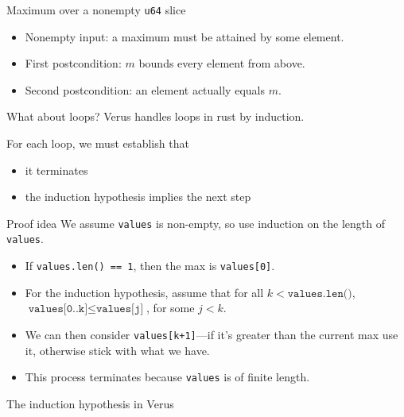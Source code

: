 \begin{frame}[fragile]{Maximum over a nonempty \texttt{u64} slice}

\begin{itemize}
\item Nonempty input: a maximum must be attained by some element.
\item First postcondition: $m$ bounds every element from above.
\item Second postcondition: an element actually equals $m$.
\end{itemize}
\end{frame}

\begin{frame}{What about loops?}
    Verus handles loops in rust by induction.
    
    For each loop, we must establish that
    \begin{itemize}
        \item it terminates
        \item the induction hypothesis implies the next step
    \end{itemize}
    \begin{block}{Proof idea}
        \small
        We assume \texttt{values} is non-empty, so use induction on the length of \texttt{values}.
        \begin{itemize}
            \setlength{\itemsep}{3pt}
            \item If \texttt{values.len() == 1}, then the max is \texttt{values[0]}.
            \item For the induction hypothesis, assume that for all
                $k < \texttt{values.len()}$, $\texttt{values[0..k]} \le \texttt{values[j]}$, for some $j<k$.
            \item We can then consider \texttt{values[k+1]}---if it's greater than the current max use it, otherwise stick with what we have.
            \item This process terminates because \texttt{values} is of finite length.
        \end{itemize}
    \end{block}
\end{frame}

\begin{frame}[fragile]{The induction hypothesis in Verus}

\end{frame}

